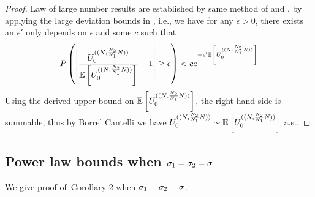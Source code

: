 \begin{proof}
Law of large number results are established by same method of \citet{Broderick2012} and \citet{Gnedin2007}, by applying the large deviation bounds in \citet[pp.911, Theorem 4]{Freedman1973}, i.e., we have for any $\epsilon>0$, there exists an $\epsilon'$ only depends on $\epsilon$ and some $c$ such that
\begin{align*}
    P\left( \left| \frac{\news{\bm{0}}{(\samplesize{},\frac{\samplesize{2}}{\samplesize{1}}\samplesize{})}}{\E\left[\news{\bm{0}}{(\samplesize{},\frac{\samplesize{2}}{\samplesize{1}}\samplesize{})}\right]}-1\right|\ge \epsilon \right)<ce^{-\epsilon'\E\left[\news{\bm{0}}{(\samplesize{},\frac{\samplesize{2}}{\samplesize{1}}\samplesize{})}\right]}
\end{align*}
Using the derived upper bound on $\E\left[\news{\bm{0}}{(\samplesize{},\frac{\samplesize{2}}{\samplesize{1}}\samplesize{})}\right]$, the right hand side is summable, thus by Borrel Cantelli we have $\news{\bm{0}}{(\samplesize{},\frac{\samplesize{2}}{\samplesize{1}}\samplesize{})}\sim \E\left[\news{\bm{0}}{(\samplesize{},\frac{\samplesize{2}}{\samplesize{1}}\samplesize{})}\right]$ a.s..

\end{proof}

\subsection{Power law bounds when $\sigma_{1}=\sigma_{2}=\sigma_{}$}
\label{sec:two_rate_the_same}
We give proof of~Corollary 2 when $\sigma_{1}=\sigma_{2}=\sigma_{}$.



